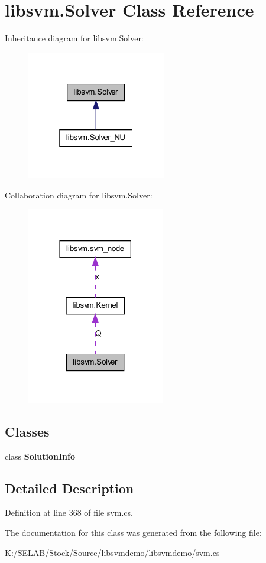 \hypertarget{classlibsvm_1_1_solver}{
\section{libsvm.Solver Class Reference}
\label{classlibsvm_1_1_solver}
}


Inheritance diagram for libsvm.Solver:
\nopagebreak
\begin{figure}[H]
\begin{center}
\leavevmode
\includegraphics[width=172pt]{classlibsvm_1_1_solver__inherit__graph}
\end{center}
\end{figure}


Collaboration diagram for libsvm.Solver:
\nopagebreak
\begin{figure}[H]
\begin{center}
\leavevmode
\includegraphics[width=170pt]{classlibsvm_1_1_solver__coll__graph}
\end{center}
\end{figure}
\subsection*{Classes}
\begin{DoxyCompactItemize}
\item 
class {\bfseries SolutionInfo}
\end{DoxyCompactItemize}


\subsection{Detailed Description}


Definition at line 368 of file svm.cs.



The documentation for this class was generated from the following file:\begin{DoxyCompactItemize}
\item 
K:/SELAB/Stock/Source/libsvmdemo/libsvmdemo/\hyperlink{svm_8cs}{svm.cs}\end{DoxyCompactItemize}
